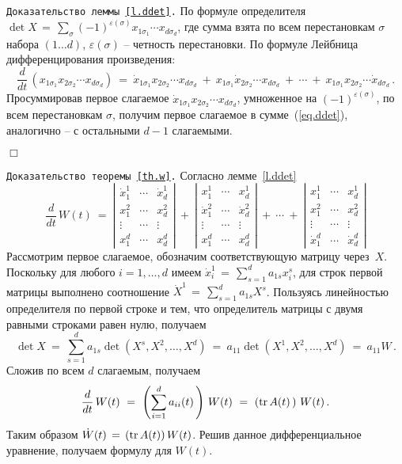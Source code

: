 \documentclass[12pt,a4paper]{article}
\begin{document}
{\tt Доказательство леммы~\ref{l.ddet}.}
По формуле определителя $\det X \, = \, \sum_{\sigma} (-1)^{\varepsilon (\sigma)} x_{1 \sigma_1}
\cdots x_{d \sigma_d}$, где сумма взята по всем перестановкам $\sigma$ набора $(1 \ldots d)$,
 $\varepsilon (\sigma)$ -- четность перестановки. По формуле Лейбница дифференцирования произведения:
 $$
 \frac{d}{dt} \, (x_{1 \sigma_1} x_{2 \sigma_2}
\cdots x_{d \sigma_d}) \ = \ \dot x_{1 \sigma_1} x_{2 \sigma_2}
\cdots x_{d \sigma_d} \ + \ x_{1 \sigma_1} \dot x_{2 \sigma_2}
\cdots x_{d \sigma_d} \ + \ \cdots \ + \ x_{1 \sigma_1} x_{2 \sigma_2}
\cdots \dot x_{d \sigma_d}\, .
 $$
Просуммировав первое слагаемое $\dot x_{1 \sigma_1} x_{2 \sigma_2}
\cdots x_{d \sigma_d}$, умноженное на $(-1)^{\varepsilon (\sigma)}$, по всем перестановкам $\sigma$,
получим первое слагаемое в сумме~(\ref{eq.ddet}), аналогично -- с остальными $d -1$ слагаемыми.

   {\hfill $\Box$}
\medskip

{\tt Доказательство теоремы~\ref{th.w}.} Согласно лемме~\ref{l.ddet}
$$
\frac{d}{dt} \, W(t)\ = \
\left|
\begin{array}{ccc}
\dot x_{1}^1 & \cdots & \dot x_{d}^1\\
 x_{1}^2 & \cdots &  x_{d}^2\\
\vdots  &    \cdots & \vdots \\
 x_{1}^d & \cdots &  x_{d}^d
\end{array}
\right| \ + \
\left|
\begin{array}{ccc}
x_{1}^1 & \cdots & x_{d}^1\\
\dot x_{1}^2 & \cdots &  \dot x_{d}^2\\
\vdots  &    \cdots & \vdots \\
 x_{1}^d & \cdots &  x_{d}^d
\end{array}
\right|
 \ + \ \cdots \ + \
\left|
\begin{array}{ccc}
x_{1}^1 & \cdots & x_{d}^1\\
x_{1}^2 & \cdots &  x_{d}^2\\
\vdots  &    \cdots & \vdots \\
\dot x_{1}^d & \cdots &  \dot x_{d}^d
\end{array}
\right|
$$
Рассмотрим первое слагаемое, обозначим соответствующую матрицу через~$X$.
Поскольку для любого $i=1, \ldots , d$ имеем $\dot x_i^1\, = \, \sum_{s=1}^d a_{1s}x_i^s$,
для строк первой матрицы выполнено соотношение $\dot X^1 \, = \, \sum_{s=1}^d a_{1s}X^s$.
Пользуясь линейностью определителя по первой строке и тем, что определитель матрицы с
двумя равными строками равен нулю, получаем
$$
\det X \ = \ \sum_{s=1}^d a_{1s}\det (X^s, X^2, \ldots , X^d) \ = \  a_{11}\det (X^1, X^2, \ldots , X^d) \ = \ a_{11} W\, .
$$
Сложив по всем $d$ слагаемым, получаем
$$
\frac{d}{dt} \, W(t)\ = \ \left( \sum_{i=1}^d a_{ii}(t)\, \right) \, W(t) \ = \ \left( {\rm tr}\, A(t)\, \right) \, W(t)\, .
$$
Таким образом $\dot W (t)\, = \, ({\rm tr}\, A(t)) \, W(t)$. Решив данное дифференциальное уравнение, получаем формулу для $W(t)$.
\end{document}
